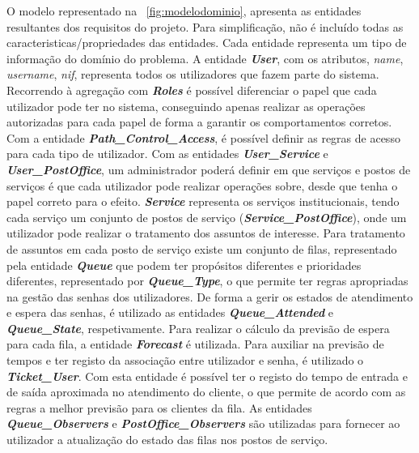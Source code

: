 O modelo representado na \figurename~\ref{fig:modelodominio}, apresenta as entidades resultantes dos requisitos do projeto. Para simplificação, não é incluído todas as caracteristicas/propriedades das entidades. Cada entidade representa um tipo de informação do domínio do problema. A entidade \textbf{\textit{User}}, com os atributos, \textit{name}, \textit{username}, \textit{nif}, representa todos os utilizadores que fazem parte do sistema. Recorrendo à agregação com \textbf{\textit{Roles}} é possível diferenciar o papel que cada utilizador pode ter no sistema, conseguindo apenas realizar as operações autorizadas para cada papel de forma a garantir os comportamentos corretos. Com a entidade \textbf{\textit{Path\_Control\_Access}}, é possível definir as regras de acesso para cada tipo de utilizador. Com as entidades \textbf{\textit{User\_Service}} e \textbf{\textit{User\_PostOffice}}, um administrador poderá definir em que serviços e postos de serviços é que cada utilizador pode realizar operações sobre, desde que tenha o papel correto para o efeito. \textbf{\textit{Service}} representa os serviços institucionais, tendo cada serviço um conjunto de postos de serviço (\textbf{\textit{Service\_PostOffice}}), onde um utilizador pode realizar o tratamento dos assuntos de interesse. Para tratamento de assuntos em cada posto de serviço existe um conjunto de filas, representado pela entidade \textbf{\textit{Queue}} que podem ter propósitos diferentes e prioridades diferentes, representado por \textbf{\textit{Queue\_Type}}, o que permite ter regras apropriadas na gestão das senhas dos utilizadores. De forma a gerir os estados de atendimento e espera das senhas, é utilizado as entidades \textbf{\textit{Queue\_Attended}} e \textbf{\textit{Queue\_State}}, respetivamente. Para realizar o cálculo da previsão de espera para cada fila, a entidade \textbf{\textit{Forecast}} é utilizada. Para auxiliar na previsão de tempos e ter registo da associação entre utilizador e senha, é utilizado o \textbf{\textit{Ticket\_User}}. Com esta entidade é possível ter o registo do tempo de entrada e de saída aproximada no atendimento do cliente, o que permite de acordo com as regras a melhor previsão para os clientes da fila. As entidades \textbf{\textit{Queue\_Observers}} e \textbf{\textit{PostOffice\_Observers}} são utilizadas para fornecer ao utilizador a atualização do estado das filas nos postos de serviço.
